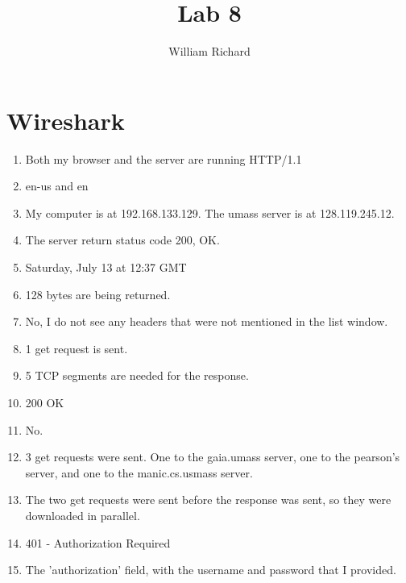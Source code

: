 \documentclass[a4paper,10pt]{article}
\title{Lab 8}
\author{William Richard}
\begin{document}
\maketitle

\section{Wireshark}

\begin{enumerate}
  \item Both my browser and the server are running HTTP/1.1
  \item en-us and en
  \item My computer is at 192.168.133.129. The umass server is at 128.119.245.12.
  \item The server return status code 200, OK.
  \item Saturday, July 13 at 12:37 GMT
  \item 128 bytes are being returned.
  \item No, I do not see any headers that were not mentioned in the list window.
  \item 1 get request is sent.
  \item 5 TCP segments are needed for the response.
  \item 200 OK
  \item No.
  \item 3 get requests were sent.  One to the gaia.umass server, one to the pearson's server, and one to the manic.cs.usmass server.
  \item The two get requests were sent before the response was sent, so they were downloaded in parallel.
  \item 401 - Authorization Required
  \item The 'authorization' field, with the username and password that I provided.
\end{enumerate}
\end{document}
